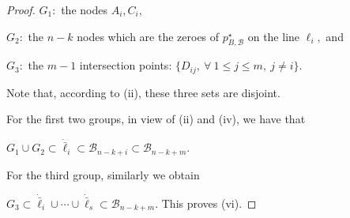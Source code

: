 \documentclass[a4paper,12pt]{article}
\theoremstyle{definition}
\numberwithin{equation}{section}
\numberwithin{figure}{section}
\newcommand{\Bset}{\mathcal{B}}
\begin{document}
\begin{proof}
$G_1:$ the nodes $A_i, C_i,$ 

$G_2:$ the $n-k$ nodes which are the zeroes of $p^\star_{B,\Bset}$ on the line $\ell_i,$  and 

$G_3:$ the $m-1$ intersection points: $\{D_{ij},\ \forall\ 1\le j\le m,\ j\neq i\}.$

Note that, according to (ii), these three sets are disjoint. 

For the first two groups,  in view of (ii) and (iv), we have that

$G_1\cup G_2\subset \dot{\bar\ell}_i\subset\Bset_{n-k+i}\subset\Bset_{n-k+m}.$

For the third group, similarly we obtain

$G_3\subset\dot{\bar\ell}_i\cup\cdots\cup\dot{\bar\ell}_s\subset\Bset_{n-k+m}.$
This proves (vi).
\end{proof}
\end{document}
